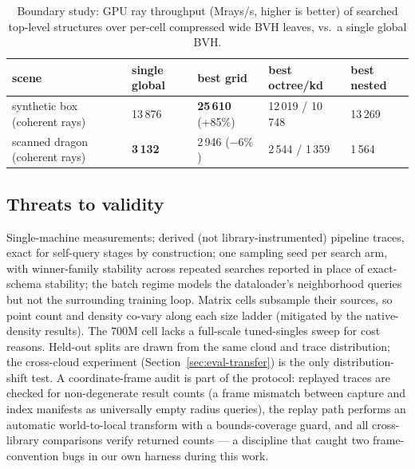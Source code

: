 \begin{table}[t]
  \centering
  \caption{Boundary study: GPU ray throughput (Mrays/s, higher is better) of searched top-level structures over per-cell compressed wide BVH leaves, vs.\ a single global BVH.}
  \label{tab:boundary}
  \small
  \begin{tabular}{lllll}
    \toprule
    scene & single global & best grid & best octree/kd & best nested \\
    \midrule
    synthetic box (coherent rays) & 13\,876 & \textbf{25\,610} (+85\%) & 12\,019 / 10\,748 & 13\,269 \\
    scanned dragon (coherent rays) & \textbf{3\,132} & 2\,946 ($-6\%$) & 2\,544 / 1\,359 & 1\,564 \\
    \bottomrule
  \end{tabular}
\end{table}

\subsection{Threats to validity}
\label{sec:eval-threats}

Single-machine measurements; derived (not library-instrumented) pipeline traces, exact for self-query stages by construction; one sampling seed per search arm, with winner-family stability across repeated searches reported in place of exact-schema stability; the batch regime models the dataloader's neighborhood queries but not the surrounding training loop. Matrix cells subsample their sources, so point count and density co-vary along each size ladder (mitigated by the native-density results). The 700M cell lacks a full-scale tuned-singles sweep for cost reasons. Held-out splits are drawn from the same cloud and trace distribution; the cross-cloud experiment (Section~\ref{sec:eval-transfer}) is the only distribution-shift test. A coordinate-frame audit is part of the protocol: replayed traces are checked for non-degenerate result counts (a frame mismatch between capture and index manifests as universally empty radius queries), the replay path performs an automatic world-to-local transform with a bounds-coverage guard, and all cross-library comparisons verify returned counts --- a discipline that caught two frame-convention bugs in our own harness during this work.
